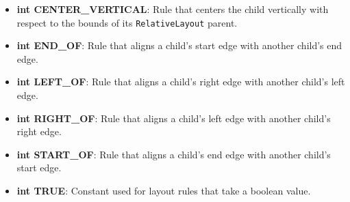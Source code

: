 \documentclass{report}
\begin{document}
\begin{itemize}
\begin{itemize}
                \item \textbf{int CENTER\_VERTICAL}: Rule that centers the child vertically with respect to the bounds of its \texttt{RelativeLayout} parent.
                \item \textbf{int END\_OF}: Rule that aligns a child's start edge with another child's end edge.
                \item \textbf{int LEFT\_OF}: Rule that aligns a child's right edge with another child's left edge.
                \item \textbf{int RIGHT\_OF}: Rule that aligns a child's left edge with another child's right edge.
                \item \textbf{int START\_OF}: Rule that aligns a child's end edge with another child's start edge.
                \item \textbf{int TRUE}: Constant used for layout rules that take a boolean value.
            \end{itemize}

    \end{itemize}




    \pagebreak 
\end{document}
